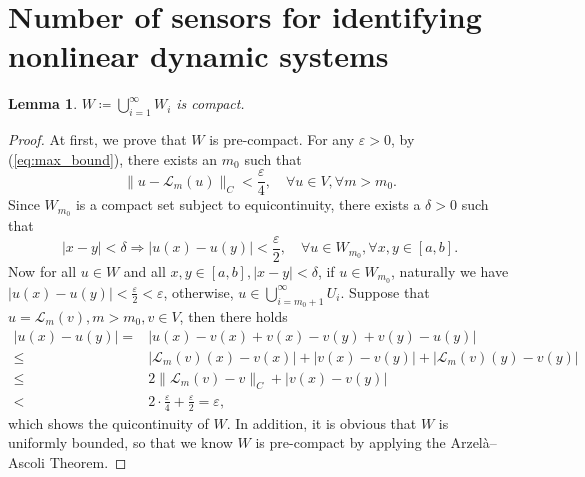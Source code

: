 \documentclass[11pt]{article}
\newtheorem{lemma}[theorem]{Lemma}
\begin{document}

\section{Number of sensors for identifying nonlinear dynamic systems}
\label{apd:m}

\begin{lemma}\label{lem:W_compact}
$W\coloneqq\bigcup_{i=1}^{\infty}W_{i}$ is compact.
\end{lemma}
\begin{proof}
At first, we prove that $W$ is pre-compact. For any $\varepsilon>0$, by (\ref{eq:max_bound}), there exists an $m_{0}$ such that
\begin{equation*}
    \|u-\mathcal{L}_{m}(u)\|_{C}<\frac{\varepsilon}{4},\quad\forall u\in V,\forall m>m_{0}.
\end{equation*}
Since $W_{m_{0}}$ is a compact set subject to equicontinuity, there exists a $\delta>0$ such that
\begin{equation*}
    |x-y|<\delta\Rightarrow|u(x)-u(y)|<\frac{\varepsilon}{2},\quad \forall u\in W_{m_{0}},\forall x,y\in [a,b].
\end{equation*}
Now for all $u\in W$ and all $x,y\in [a,b], |x-y|<\delta$, if $u\in W_{m_{0}}$, naturally we have $|u(x)-u(y)|<\frac{\varepsilon}{2}<\varepsilon$, otherwise, $u\in \bigcup_{i=m_{0}+1}^{\infty}U_{i}$. Suppose that $u=\mathcal{L}_{m}(v),m>m_{0},v\in V$, then there holds
\begin{equation*}
\begin{split}
    |u(x)-u(y)|= &|u(x)-v(x)+v(x)-v(y)+v(y)-u(y)| \\
    \leq &|\mathcal{L}_{m}(v)(x)-v(x)|+|v(x)-v(y)|+|\mathcal{L}_{m}(v)(y)-v(y)| \\
    \leq &2\|\mathcal{L}_{m}(v)-v\|_{C}+|v(x)-v(y)| \\
    < &2\cdot \frac{\varepsilon}{4}+\frac{\varepsilon}{2}=\varepsilon,
\end{split}
\end{equation*}
which shows the quicontinuity of $W$. In addition, it is obvious that $W$ is uniformly bounded, so that we know $W$ is pre-compact by applying the Arzelà–Ascoli Theorem.


\end{proof}
\end{document}
